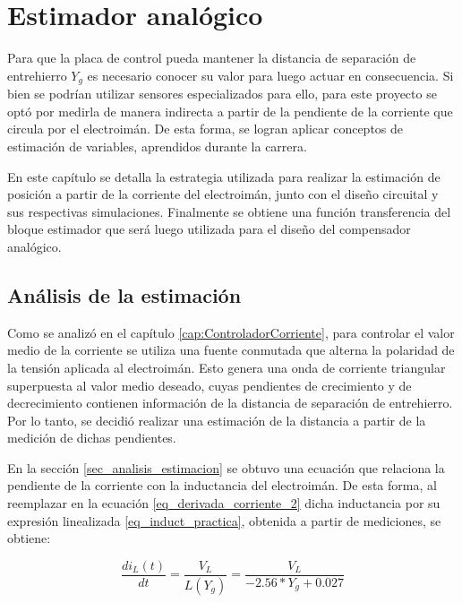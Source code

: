 \chapter{Estimador analógico}  \label{cap:Estimador Analogico}

Para que la placa de control pueda mantener la distancia de separación de entrehierro $Y_{g}$ es necesario conocer su valor para luego actuar en consecuencia. Si bien se podrían utilizar sensores  especializados para ello, para este proyecto se optó por medirla de manera indirecta a partir de la pendiente de la corriente que circula por el electroimán. De esta forma, se logran aplicar conceptos de estimación de variables, aprendidos durante la carrera. 

En este capítulo se detalla la estrategia utilizada para realizar la estimación de posición a partir de la corriente del electroimán, junto con el diseño circuital y sus respectivas simulaciones. Finalmente se obtiene una función transferencia del bloque estimador que será luego utilizada para el diseño del compensador analógico.

\section{Análisis de la estimación}\label{analisis_de_estimacion}

Como se analizó en el capítulo \ref{cap:ControladorCorriente}, para controlar el valor medio de la corriente se utiliza una fuente conmutada que alterna la polaridad de la tensión aplicada al electroimán. Esto genera una onda de corriente triangular superpuesta al valor medio deseado, cuyas pendientes de crecimiento y de decrecimiento contienen información de la distancia de separación de entrehierro. Por lo tanto, se decidió realizar una estimación de la distancia a partir de la medición de dichas pendientes.

En la sección \ref{sec_analisis_estimacion} se obtuvo una ecuación que relaciona la pendiente de la corriente con la inductancia del electroimán. De esta forma, al reemplazar en la ecuación \ref{eq_derivada_corriente_2} dicha inductancia por su expresión linealizada \ref{eq_induct_practica}, obtenida a partir de mediciones, se obtiene:

\begin{equation} \label{eq_derivada_corriente_3}
	\frac{di_L(t)}{dt}= \frac{V_L}{L(Y_g)}=\frac{V_L}{-2.56*Y_{g}+0.027}
\end{equation}

